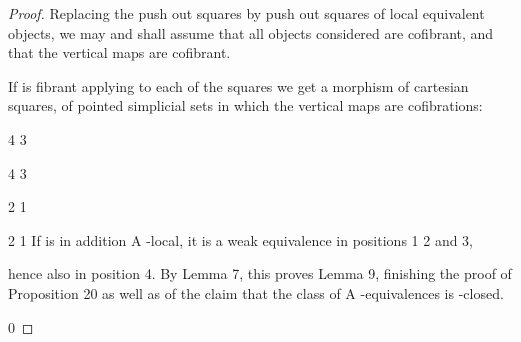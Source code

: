 \documentclass[11pt,a4paper]{article}
\theoremstyle{plain}
\theoremstyle{definition}
\begin{document}
\begin{proof} Replacing the push out squares by push out squares of local equivalent
objects, we may and shall assume that all objects considered are cofibrant, and that
the vertical maps are cofibrant.





  

If
is fibrant applying 
to each of the squares we get a morphism
of cartesian squares, of pointed simplicial sets in which the vertical maps are
cofibrations:

4   3 







4   3 






2   1 




2   1 
If  is in addition A -local, it is a weak equivalence in positions 1 2 and 3,

hence also in position 4. By Lemma 7, this proves Lemma 9, finishing the proof
of Proposition 20 as well as of the claim that the class of A -equivalences is
 -closed.


0



\end{proof}
\end{document}

